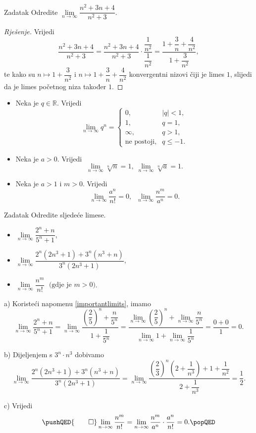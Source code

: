 \begin{exercise}{Zadatak}
Odredite \(\lim\limits_{n\to \infty}{\dfrac{n^2+3n+4}{n^2+3}}\).
\end{exercise}
\begin{proof}[Rješenje]
Vrijedi
\[\dfrac{n^2+3n+4}{n^2+3}=\dfrac{n^2+3n+4}{n^2+3}\cdot \dfrac{\dfrac{1}{n^2}}{\dfrac{1}{n^2}}=\dfrac{1+\dfrac{3}{n}+\dfrac{4}{n^2}}{1+\dfrac{3}{n^2}},\]
te kako su \(n\mapsto 1+\dfrac{3}{n^2}\) i \(n\mapsto 1+\dfrac{3}{n}+\dfrac{4}{n^2}\) konvergentni nizovi čiji je limes \(1\), slijedi da je limes početnog niza također \(1\).
\end{proof}
\newpage
\begin{remark} \textbf{}
\label{importantlimits}
\begin{itemize}
\item Neka je \(q\in \mathbb{R}\). Vrijedi
\[\lim\limits_{n\to \infty}{q^n}=\begin{cases}
0, & |q|<1,\\
1, & q=1,\\
\infty, & q>1,\\
\text{ne postoji}, & q\leq -1.
\end{cases}\]
\item Neka je \(a>0\). Vrijedi
\[\lim\limits_{n\to \infty}{\sqrt[n]{n}}=1,\;\lim\limits_{n\to \infty}{\sqrt[n]{a}}=1.\]
\item Neka je \(a>1\) i \(m>0\). Vrijedi
\[\lim\limits_{n\to \infty}{\dfrac{a^n}{n!}}=0,\;\; \lim\limits_{n\to \infty}{\dfrac{n^m}{a^n}}=0.\]
\end{itemize}
\end{remark}
\begin{exercise}{Zadatak} Odredite sljedeće limese.
\begin{itemize}
\item[a)] \(\lim\limits_{n\to \infty}{\dfrac{2^n+n}{5^n+1}}\),
\item[b)] \(\lim\limits_{n\to \infty}{\dfrac{2^n(2n^3+1)+3^n(n^3+n)}{3^n(2n^3+1)}}\),
\item[c)] \(\lim\limits_{n\to \infty}{\dfrac{n^m}{n!}}\;\text{ (gdje je } m>0\text{)}\).
\end{itemize}
\end{exercise}
\begin{proof*}
a) Koristeći napomenu \ref{importantlimits}, imamo
\[\lim\limits_{n\to \infty}{\dfrac{2^n+n}{5^n+1}}=\lim\limits_{n\to \infty}{\dfrac{\left(\dfrac{2}{5}\right)^n+\dfrac{n}{5^n}}{1+\dfrac{1}{5^n}}}=\dfrac{\lim\limits_{n\to \infty}{\left(\dfrac{2}{5}\right)^n}+\lim\limits_{n\to \infty}{\dfrac{n}{5^n}}}{\lim\limits_{n\to \infty}{1}+\lim\limits_{n\to \infty}{\dfrac{1}{5^n}}}=\dfrac{0+0}{1}=0.\]

b) Dijeljenjem s \(3^n\cdot n^3\) dobivamo
\[\lim\limits_{n\to \infty}{\dfrac{2^n(2n^3+1)+3^n(n^3+n)}{3^n(2n^3+1)}}=\lim\limits_{n\to \infty}{\dfrac{\left(\dfrac{2}{3}\right)^n\left(2 + \dfrac{1}{n^{3}}\right)+1 + \dfrac{1}{n^{2}}}{2 + \dfrac{1}{n^{3}}}}=\dfrac{1}{2}.\]

c) Vrijedi
\[
\pushQED{\qed}
\lim\limits_{n\to \infty}{\dfrac{n^m}{n!}}=\lim\limits_{n\to \infty}{\dfrac{n^m}{a^n}\cdot \dfrac{a^n}{n!}}=0.\qedhere
\popQED
\]
\end{proof*}
